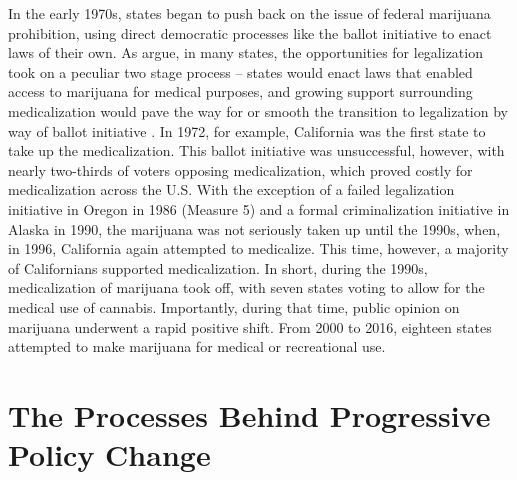 In the early 1970s, states began to push back on the issue of federal marijuana prohibition, using direct democratic processes like the ballot initiative to enact laws of their own. As \citet{newhart_and_dolphin_2018} argue, in many states, the opportunities for legalization took on a peculiar two stage process -- states would enact laws that enabled access to marijuana for medical purposes, and growing support surrounding medicalization would pave the way for or smooth the transition to legalization by way of ballot initiative \citep{kilmer_and_maccoun_2017}. In 1972, for example, California was the first state to take up the medicalization. This ballot initiative was unsuccessful, however, with nearly two-thirds of voters opposing medicalization, which proved costly for medicalization across the U.S. With the exception of a failed legalization initiative in Oregon in 1986 (Measure 5) and a formal criminalization initiative in Alaska in 1990, the marijuana was not seriously taken up until the 1990s, when, in 1996, California again attempted to medicalize. This time, however, a majority of Californians supported medicalization. In short, during the 1990s, medicalization of marijuana took off, with seven states voting to allow for the medical use of cannabis. Importantly, during that time, public opinion on marijuana underwent a rapid positive shift. From 2000 to 2016, eighteen states attempted to make marijuana for medical or recreational use.


\begin{center}
{\renewcommand\normalsize{\scriptsize}

}
\end{center}



  



\section{The Processes Behind Progressive Policy Change}


